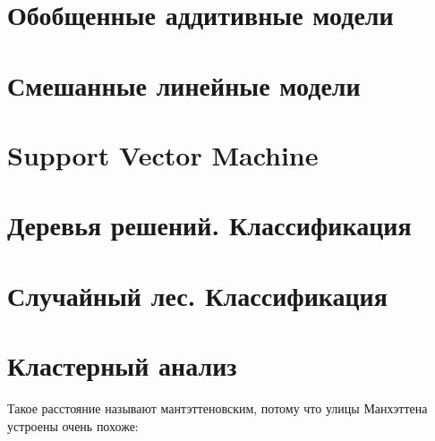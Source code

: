 \documentclass[
  letterpaper,
]{scrbook}
\theoremstyle{definition}
\theoremstyle{remark}
\begin{document}

\chapter{Обобщенные аддитивные модели}\label{andan-gam}


\chapter{Смешанные линейные модели}\label{andan-glmm}


\chapter{Support Vector Machine}\label{andan-svm}


\chapter{Деревья решений. Классификация}\label{andan-treesclass}


\chapter{Случайный лес. Классификация}\label{andan-randforestclass}


\chapter{Кластерный анализ}\label{andan-cluster}

Такое расстояние называют мантэттеновским, потому что улицы Манхэттена
устроены очень похоже:
\end{document}
